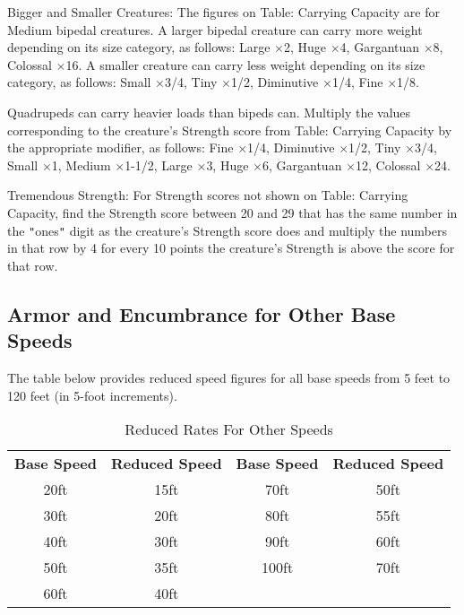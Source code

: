 Bigger and Smaller Creatures: The figures on Table: Carrying Capacity are for Medium bipedal creatures. A larger bipedal creature can carry more weight depending on its size category, as follows: Large \mbox{$\times$}2, Huge \mbox{$\times$}4, Gargantuan \mbox{$\times$}8, Colossal \mbox{$\times$}16. A smaller creature can carry less weight depending on its size category, as follows: Small \mbox{$\times$}3/4, Tiny \mbox{$\times$}1/2, Diminutive \mbox{$\times$}1/4, Fine \mbox{$\times$}1/8.
				
Quadrupeds can carry heavier loads than bipeds can. Multiply the values corresponding to the creature's Strength score from Table: Carrying Capacity by the appropriate modifier, as follows: Fine \mbox{$\times$}1/4, Diminutive \mbox{$\times$}1/2, Tiny \mbox{$\times$}3/4, Small \mbox{$\times$}1, Medium \mbox{$\times$}1-1/2, Large \mbox{$\times$}3, Huge \mbox{$\times$}6, Gargantuan \mbox{$\times$}12, Colossal \mbox{$\times$}24.
				
Tremendous Strength: For Strength scores not shown on Table: Carrying Capacity, find the Strength score between 20 and 29 that has the same number in the \texttt{{}"{}}ones\texttt{{}"{}} digit as the creature's Strength score does and multiply the numbers in that row by 4 for every 10 points the creature's Strength is above the score for that row.
				
\subsection{Armor and Encumbrance for Other Base Speeds}

				
The table below provides reduced speed figures for all base speeds from 5 feet to 120 feet (in 5-foot increments).

\begin{table}[htb]
\sffamily
{}
\caption{Reduced Rates For Other Speeds}
\centering
\begin{tabular}{c c c c}
\textbf{Base Speed} & \textbf{Reduced Speed} & \textbf{Base Speed} & \textbf{Reduced Speed}\\
20ft & 15ft & 70ft & 50ft\\
30ft & 20ft & 80ft & 55ft\\
40ft & 30ft & 90ft & 60ft\\
50ft & 35ft & 100ft & 70ft\\
60ft & 40ft & & \\
\end{tabular}
\end{table}
				

